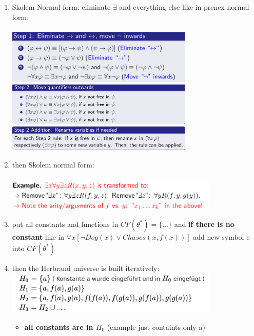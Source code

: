\documentclass[conference]{styles/acmsiggraph}
\begin{document}
\begin{enumerate}
    \item Skolem Normal form: eliminate  $\exists$ and everything else like in prenex normal form:\\\\
    \includegraphics[width=0.7\textwidth]{imgs/step1.png}\\
    \includegraphics[width=0.7\textwidth]{imgs/step2.png}\\
    \includegraphics[width=0.7\textwidth]{imgs/step2-add.png}\\
    \item then Skolem normal form:\\\\
    \includegraphics[width=0.8\textwidth]{imgs/skolem.png}\\
    \item put all constants and functions in $CF({\theta}^*) = \{...\}$ and \textbf{if there is no constant} like in $\forall x[\neg Dog(x) \lor Chases(x,f(x))]$ add new symbol c into $CF({\theta}^*)$\\
    \item then the Herbrand universe is built iteratively:\\
    \includegraphics[width=0.8\textwidth]{imgs/herbrand2.png}
    \begin{itemize}
        \item \textbf{all constants are in $H_0$} (example just containts only a)

\end{itemize}
\end{enumerate}
\end{document}
